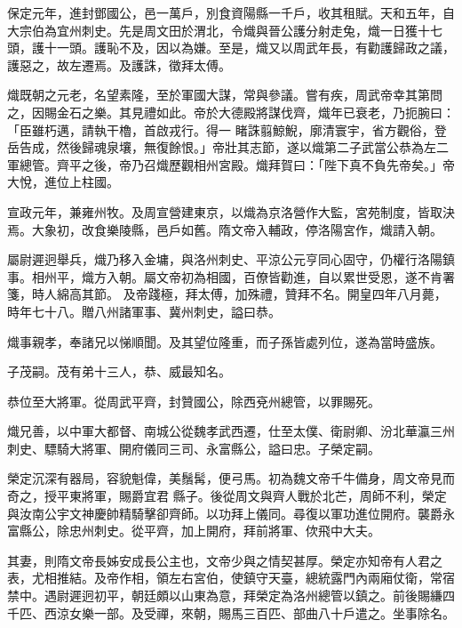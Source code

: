 \begin{pinyinscope}
 保定元年，進封鄧國公，邑一萬戶，別食資陽縣一千戶，收其租賦。天和五年，自大宗伯為宜州刺史。先是周文田於渭北，令熾與晉公護分射走兔，熾一日獲十七頭，護十一頭。護恥不及，因以為嫌。至是，熾又以周武年長，有勸護歸政之議，護惡之，故左遷焉。及護誅，徵拜太傅。



 熾既朝之元老，名望素隆，至於軍國大謀，常與參議。嘗有疾，周武帝幸其第問之，因賜金石之樂。其見禮如此。帝於大德殿將謀伐齊，熾年已衰老，乃扼腕曰：「臣雖朽邁，請執干櫓，首啟戎行。得一
 睹誅翦鯨鯢，廓清寰宇，省方觀俗，登岳告成，然後歸魂泉壤，無復餘恨。」帝壯其志節，遂以熾第二子武當公恭為左二軍總管。齊平之後，帝乃召熾歷觀相州宮殿。熾拜賀曰：「陛下真不負先帝矣。」帝大悅，進位上柱國。



 宣政元年，兼雍州牧。及周宣營建東京，以熾為京洛營作大監，宮苑制度，皆取決焉。大象初，改食樂陵縣，邑戶如舊。隋文帝入輔政，停洛陽宮作，熾請入朝。



 屬尉遲迥舉兵，熾乃移入金墉，與洛州刺史、平涼公元亨同心固守，仍權行洛陽鎮事。相州平，熾方入朝。屬文帝初為相國，百僚皆勸進，自以累世受恩，遂不肯署箋，時人綿高其節。
 及帝踐極，拜太傅，加殊禮，贊拜不名。開皇四年八月薨，時年七十八。贈八州諸軍事、冀州刺史，謚曰恭。



 熾事親孝，奉諸兄以悌順聞。及其望位隆重，而子孫皆處列位，遂為當時盛族。



 子茂嗣。茂有弟十三人，恭、威最知名。



 恭位至大將軍。從周武平齊，封贊國公，除西兗州總管，以罪賜死。



 熾兄善，以中軍大都督、南城公從魏孝武西遷，仕至太僕、衛尉卿、汾北華瀛三州刺史、驃騎大將軍、開府儀同三司、永富縣公，謚曰忠。子榮定嗣。



 榮定沉深有器局，容貌魁偉，美鬚髯，便弓馬。初為魏文帝千牛備身，周文帝見而奇之，授平東將軍，賜爵宜君
 縣子。後從周文與齊人戰於北芒，周師不利，榮定與汝南公宇文神慶帥精騎擊卻齊師。以功拜上儀同。尋復以軍功進位開府。襲爵永富縣公，除忠州刺史。從平齊，加上開府，拜前將軍、佽飛中大夫。



 其妻，則隋文帝長姊安成長公主也，文帝少與之情契甚厚。榮定亦知帝有人君之表，尤相推結。及帝作相，領左右宮伯，使鎮守天臺，總統露門內兩廂仗衛，常宿禁中。遇尉遲迥初平，朝廷頗以山東為意，拜榮定為洛州總管以鎮之。前後賜縑四千匹、西涼女樂一部。及受禪，來朝，賜馬三百匹、部曲八十戶遣之。坐事除名。




\end{pinyinscope}
